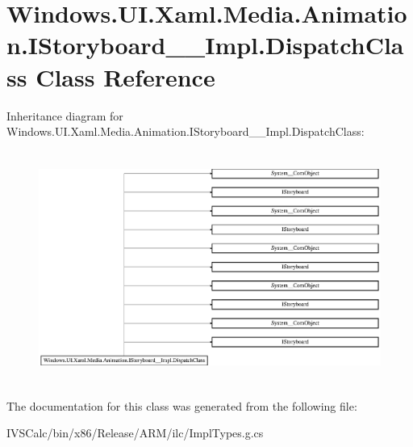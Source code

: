 \hypertarget{class_windows_1_1_u_i_1_1_xaml_1_1_media_1_1_animation_1_1_i_storyboard_____impl_1_1_dispatch_class}{}\section{Windows.\+U\+I.\+Xaml.\+Media.\+Animation.\+I\+Storyboard\+\_\+\+\_\+\+Impl.\+Dispatch\+Class Class Reference}
\label{class_windows_1_1_u_i_1_1_xaml_1_1_media_1_1_animation_1_1_i_storyboard_____impl_1_1_dispatch_class}
Inheritance diagram for Windows.\+U\+I.\+Xaml.\+Media.\+Animation.\+I\+Storyboard\+\_\+\+\_\+\+Impl.\+Dispatch\+Class\+:\begin{figure}[H]
\begin{center}
\leavevmode
\includegraphics[height=7.604939cm]{class_windows_1_1_u_i_1_1_xaml_1_1_media_1_1_animation_1_1_i_storyboard_____impl_1_1_dispatch_class}
\end{center}
\end{figure}


The documentation for this class was generated from the following file\+:\begin{DoxyCompactItemize}
\item 
I\+V\+S\+Calc/bin/x86/\+Release/\+A\+R\+M/ilc/Impl\+Types.\+g.\+cs\end{DoxyCompactItemize}
